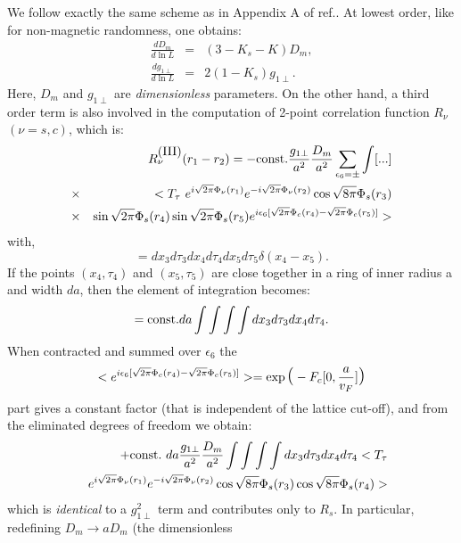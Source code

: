 We follow exactly the same scheme as in Appendix A of ref.\cite{Giam2}.
At lowest order, like for non-magnetic randomness, one obtains:
\begin{eqnarray}
\frac{dD_m}{d\ln L} &=& (3-K_s-K)D_m,\\ \nonumber
\frac{dg_{1\perp}}{d\ln L} &=& 2(1-K_s)g_{1\perp}.
\end{eqnarray}
Here, $D_m$ and $g_{1\perp}$ are {\it dimensionless} parameters.
On the other hand,  a third order term is also involved in the computation
of 2-point correlation function ${R}_{\nu}$ $(\nu=s,c)$, which is:
\begin{eqnarray}
& &{R}_{\nu}^{\hbox{(III)}}(r_1-r_2)=-\hbox{const.}\frac{g_{1\perp}}{a^2}\frac{D_m}{a^2}\sum_{\epsilon_6=\pm}\int
[...]\\ \nonumber
&\times & <T_{\tau}\ e^{i\sqrt{2\pi}\Phi_{\nu}(r_1)}
e^{-i\sqrt{2\pi}\Phi_{\nu}(r_2)}\cos\sqrt{8\pi}\Phi_s(r_3)\\ \nonumber
&\times & \sin\sqrt{2\pi}\Phi_s(r_4)\sin\sqrt{2\pi}\Phi_s(r_5)e^{i\epsilon_6
[\sqrt{2\pi}\Phi_{c}(r_4)-\sqrt{2\pi}\Phi_{c}(r_5)]}>
\end{eqnarray}
with,
\begin{equation}
[...]= dx_3 d\tau_3 dx_4 d\tau_4 dx_5 d\tau_5\delta(x_4-x_5).
\end{equation}
If the points $(x_4,\tau_4)$ and $(x_5,\tau_5)$ are close together in
a ring of inner radius a and width $da$, then the
element of integration becomes:
\begin{equation}
[...]=\hbox{const.}da\int\int\int\int dx_3 d\tau_3 dx_4 d\tau_4.
\end{equation}
When contracted and summed over $\epsilon_6$ the
\begin{equation}
<e^{i\epsilon_6
[\sqrt{2\pi}\Phi_{c}(r_4)-\sqrt{2\pi}\Phi_{c}(r_5)]}>=\exp{\hbox{\Large(}-F_c
[0,\frac{a}{v_F}]{\hbox{\Large)}}}
\end{equation}
part gives a constant factor (that is independent of the lattice cut-off), and
from the eliminated degrees of freedom we obtain:
\begin{eqnarray}
& & + \hbox{const.}\ da\frac{g_{1\perp}}{a^2}\frac{D_m}{a^2}\int\int\int\int dx_3d\tau_3 dx_4 d\tau_4 <T_{\tau} \\ \nonumber
& &e^{i\sqrt{2\pi}\Phi_{\nu}(r_1)}
e^{-i\sqrt{2\pi}\Phi_{\nu}(r_2)}\cos\sqrt{8\pi}\Phi_s(r_3)\cos\sqrt{8\pi}\Phi_s(r_4)>
\end{eqnarray}
which is {\it identical} to a $g_{1\perp}^2$ term and contributes only to
$R_s$. In particular, redefining $D_m\rightarrow aD_m$ (the dimensionless
